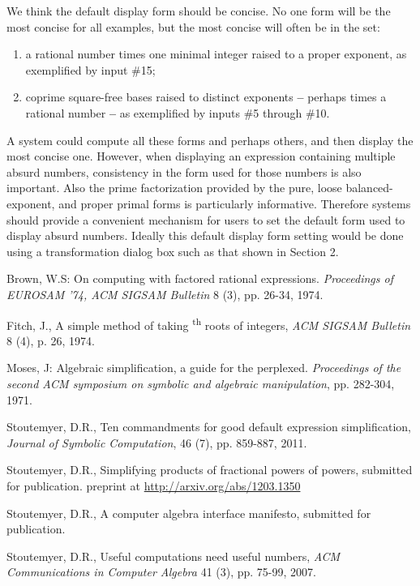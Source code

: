 \documentclass[12pt,english]{article}
\theoremstyle{definition}
\theoremstyle{remark}
\theoremstyle{plain}
\theoremstyle{plain}
\begin{document}
We think the default display form should be concise. No one form will
be the most concise for all examples, but the most concise will often
be in the set:
\begin{enumerate}
\item a rational number times one minimal integer raised to a proper exponent,
as exemplified by input \#15;
\item coprime square-free bases raised to distinct exponents \textbf{--}
perhaps times a rational number \textbf{--} as exemplified by inputs
\#5 through \#10.
\end{enumerate}
A system could compute all these forms and perhaps others, and then
display the most concise one. However, when displaying an expression
containing multiple absurd numbers, consistency in the form used for
those numbers is also important. Also the prime factorization provided
by the pure, loose balanced-exponent, and proper primal forms is particularly
informative. Therefore systems should provide a convenient mechanism
for users to set the default form used to display absurd numbers.
Ideally this default display form setting would be done using a transformation
dialog box such as that shown in Section 2.
\begin{thebibliography}{1}
 Brown, W.S: On computing with factored rational expressions.
\textsl{Proceedings of EUROSAM '74, ACM SIGSAM Bulletin} 8 (3), pp.
26-34, 1974.

Fitch, J., A simple method of
taking \textsuperscript{th} roots of integers, \textsl{ACM SIGSAM
Bulletin} 8 (4), p. 26, 1974.

 Moses, J: Algebraic simplification,
a guide for the perplexed. \textsl{Proceedings of the second ACM symposium
on symbolic and algebraic manipulation}, pp. 282-304, 1971.

Stoutemyer, D.R., Ten commandments
for good default expression simplification, \textsl{Journal of Symbolic
Computation}, 46 (7), pp. 859-887, 2011.

Stoutemyer, D.R., Simplifying
products of fractional powers of powers, submitted for publication.
preprint at \url{http://arxiv.org/abs/1203.1350}

Stoutemyer, D.R., A computer algebra
interface manifesto, submitted for publication.

Stoutemyer, D.R., Useful computations need
useful numbers, \textsl{ACM Communications in Computer Algebra} 41
(3), pp. 75-99, 2007.\end{thebibliography}
\end{document}
